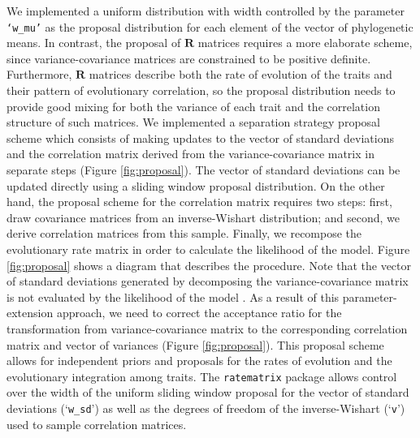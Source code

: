 We implemented a uniform distribution with width controlled by the parameter \texttt{`w\_mu'} as the proposal distribution for each element of the vector of phylogenetic means. In contrast, the proposal of $\mathbf{R}$ matrices requires a more elaborate scheme, since variance-covariance matrices are constrained to be positive definite. Furthermore, $\mathbf{R}$ matrices describe both the rate of evolution of the traits and their pattern of evolutionary correlation, so the proposal distribution needs to provide good mixing for both the variance of each trait and the correlation structure of such matrices. We implemented a separation strategy \citep{barnard_modeling_2000, zhang_sampling_2006, liu_comparison_2016} proposal scheme which consists of making updates to the vector of standard deviations and the correlation matrix derived from the variance-covariance matrix in separate steps (Figure \ref{fig:proposal}). The vector of standard deviations can be updated directly using a sliding window proposal distribution. On the other hand, the proposal scheme for the correlation matrix requires two steps: first, draw covariance matrices from an inverse-Wishart distribution; and second, we derive correlation matrices from this sample. Finally, we recompose the evolutionary rate matrix in order to calculate the likelihood of the model. Figure \ref{fig:proposal} shows a diagram that describes the procedure. Note that the vector of standard deviations generated by decomposing the variance-covariance matrix is not evaluated by the likelihood of the model \citep{zhang_sampling_2006}. As a result of this parameter-extension approach, we need to correct the acceptance ratio for the transformation from variance-covariance matrix to the corresponding correlation matrix and vector of variances (Figure \ref{fig:proposal}). This proposal scheme allows for independent priors and proposals for the rates of evolution and the evolutionary integration among traits. The \texttt{ratematrix} package allows control over the width of the uniform sliding window proposal for the vector of standard deviations (`\texttt{w\_sd}') as well as the degrees of freedom of the inverse-Wishart (`\texttt{v}') used to sample correlation matrices.

\pagebreak


